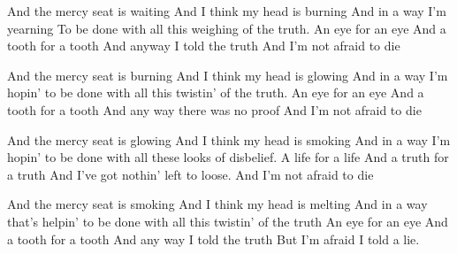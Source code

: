 \begin{guitar}
\begin{multicols}{2}
And the mercy seat is waiting
And I think my head is burning
And in a way I'm yearning
To be done with all this weighing of the truth.
An eye for an eye
And a tooth for a tooth
And anyway I told the truth
And I'm not afraid to die

And the mercy seat is burning
And I think my head is glowing
And in a way I'm hopin'
to be done with all this twistin' of the truth.
An eye for an eye
And a tooth for a tooth
And any way there was no proof
And I'm not afraid to die

And the mercy seat is glowing
And I think my head is smoking
And in a way I'm hopin'
to be done with all these looks of disbelief.
A life for a life
And a truth for a truth
And I've got nothin' left to loose.
And I'm not afraid to die

And the mercy seat is smoking
And I think my head is melting
And in a way that's helpin'
to be done with all this twistin' of the truth
An eye for an eye
And a tooth for a tooth
And any way I told the truth
But I'm afraid I told a lie.
\end{multicols}
\end{guitar}
